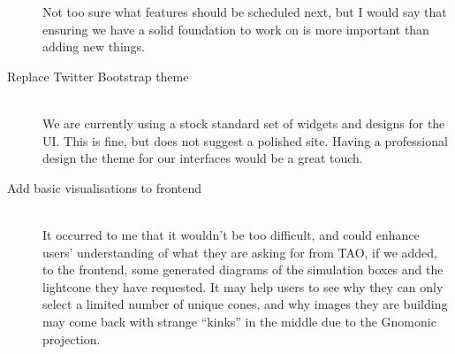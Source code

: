 \documentclass[12pt]{scrartcl}
\begin{document}
\begin{description}
    Not too sure what features should be scheduled next, but I would
    say that ensuring we have a solid foundation to work on is more
    important than adding new things.
  \item[Replace Twitter Bootstrap theme] \hfill \\
    We are currently using a stock standard set of widgets and designs
    for the UI. This is fine, but does not suggest a polished
    site. Having a professional design the theme for our interfaces
    would be a great touch.
  \item[Add basic visualisations to frontend] \hfill \\
    It occurred to me that it wouldn't be too difficult, and could
    enhance users' understanding of what they are asking for from TAO,
    if we added, to the frontend, some generated diagrams of the
    simulation boxes and the lightcone they have requested. It may
    help users to see why they can only select a limited number of
    unique cones, and why images they are building may come back with
    strange ``kinks'' in the middle due to the Gnomonic projection.
\end{description}
\end{document}
